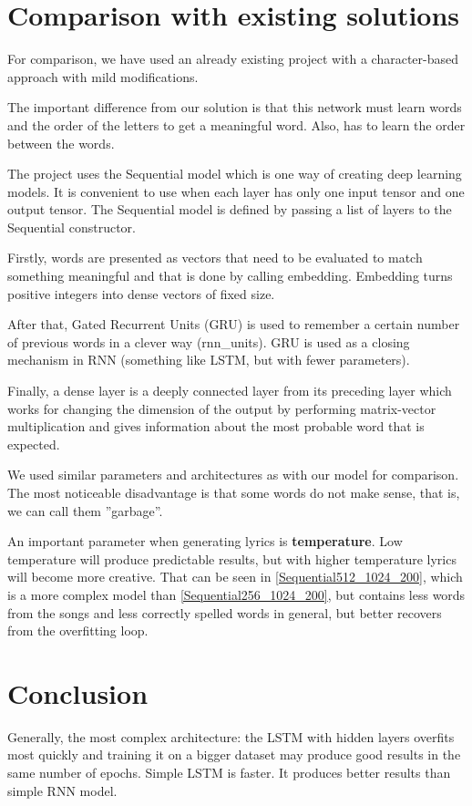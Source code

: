 \documentclass[conference]{IEEEtran}
\begin{document}
\section{Comparison with existing solutions}
For comparison, we have used an already existing project with a character-based approach with mild modifications.

The important difference from our solution is that this network must learn words and the order of the letters to get a meaningful word.
Also, has to learn the order between the words.

The project uses the Sequential model which is one way of creating deep learning models. 
It is convenient to use when each layer has only one input tensor and one output
tensor. The Sequential model is defined by passing a list of layers to the Sequential
constructor.

Firstly, words are presented as vectors that need to be evaluated to match
something meaningful and that is done by calling embedding. Embedding turns positive integers
into dense vectors of fixed size. 

After that, Gated Recurrent Units (GRU) is used to remember
a certain number of previous words in a clever way (rnn\_units). GRU is used as a closing mechanism in RNN (something like LSTM, but with fewer parameters). 

Finally, a dense layer is a deeply connected layer
from its preceding layer which works for changing the dimension of the output by
performing matrix-vector multiplication and gives information about the most probable word that
is expected.

We used similar parameters and architectures as with our model for comparison. 
The most noticeable disadvantage is that some words do not make sense, that is, we can call them ''garbage''.

An important parameter when generating lyrics is \textbf{temperature}. Low temperature will produce predictable results, but with 
higher temperature lyrics will become more creative. That can be seen in 
\ref{Sequential512_1024_200}, which is a more complex model than
\ref{Sequential256_1024_200}, but contains less words from the songs and less
correctly spelled words in general, but better recovers from the overfitting loop.

\section{Conclusion}
Generally, the most complex architecture: the LSTM with hidden layers overfits
most quickly and training it on a bigger dataset may produce good results in the
same number of epochs. Simple LSTM is faster. It produces better results than
simple RNN model.
\end{document}
